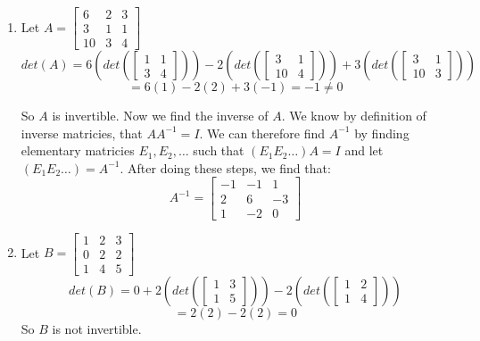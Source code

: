 \documentclass{article}
\begin{document}
\begin{enumerate}[label=(\alph*)]
\item
Let $A = \begin{bmatrix}
  6 & 2 & 3\\
  3 & 1 & 1\\
  10 & 3 & 4
\end{bmatrix}$
\begin{equation}
  det(A) = 6(det(
    \begin{bmatrix} 
      1 & 1 \\ 3 & 4 
    \end{bmatrix}))
  - 2(det(
    \begin{bmatrix}
    3 & 1 \\ 10 & 4
    \end{bmatrix}))  
  + 3(det(
    \begin{bmatrix}
    3 & 1 \\ 10 & 3
  \end{bmatrix}))
\end{equation}
\[ = 6(1) - 2(2) + 3(-1) = -1 \neq 0\]

So $A$ is invertible. Now we find the inverse of $A$. We know by definition of inverse matricies,
that $AA^{-1} = I$. We can therefore find $A^{-1}$ by finding elementary matricies $E_1, E_2, \ldots$
such that $(E_1E_2\ldots)A = I$ and let $(E_1E_2\ldots) = A^{-1}$. After doing these steps,
we find that:
\[A^{-1} = \begin{bmatrix}
  -1 & -1 & 1 \\ 2 & 6 & -3 \\ 1 & -2 & 0
\end{bmatrix}\]
\item
Let $B = \begin{bmatrix}
  1 & 2 & 3\\
  0 & 2 & 2\\
  1 & 4 & 5
\end{bmatrix}$
\begin{equation}
  det(B) = 0 + 2(det(
    \begin{bmatrix}
      1 & 3 \\ 1 & 5
    \end{bmatrix}
  )) - 2(det(
    \begin{bmatrix}
      1 & 2 \\ 1 & 4
    \end{bmatrix}
  ))
\end{equation}
\[= 2(2) - 2(2) = 0\]
So $B$ is not invertible.

\end{enumerate}
\end{document}
